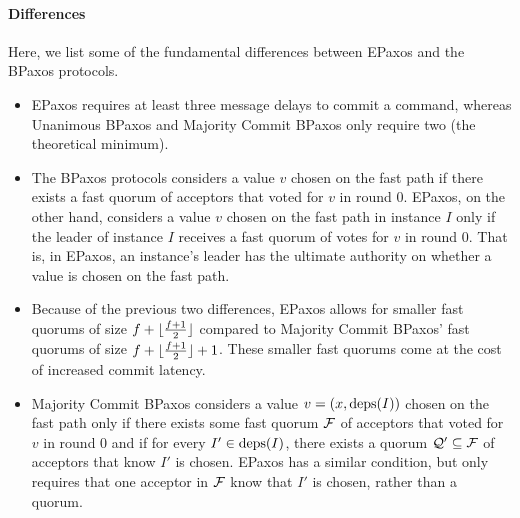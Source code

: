 \paragraph{Differences}
Here, we list some of the fundamental differences between EPaxos and the BPaxos
protocols.
\begin{itemize}
  \item
    EPaxos requires at least three message delays to commit a command, whereas
    Unanimous BPaxos and Majority Commit BPaxos only require two (the
    theoretical minimum).

  \item
    The BPaxos protocols considers a value $v$ chosen on the fast path if there
    exists a fast quorum of acceptors that voted for $v$ in round $0$.  EPaxos,
    on the other hand, considers a value $v$ chosen on the fast path in
    instance $I$ only if the leader of instance $I$ receives a fast quorum of
    votes for $v$ in round $0$.  That is, in EPaxos, an instance's leader has
    the ultimate authority on whether a value is chosen on the fast path.

  \item
    Because of the previous two differences, EPaxos allows for smaller fast
    quorums of size $f + \lfloor\frac{f+1}{2}\rfloor$ compared to Majority Commit
    BPaxos' fast quorums of size $f + \lfloor\frac{f + 1}{2}\rfloor + 1$. These smaller fast quorums
    come at the cost of increased commit latency.

  \item
    Majority Commit BPaxos considers a value $v = (x, \text{deps}(I))$ chosen on the
    fast path only if there exists some fast quorum $\mathcal{F}$ of acceptors
    that voted for $v$ in round $0$ and if for every $I' \in \text{deps}(I)$, there
    exists a quorum $\mathcal{Q}' \subseteq \mathcal{F}$ of acceptors that know
    $I'$ is chosen. EPaxos has a similar condition, but only requires that one
    acceptor in $\mathcal{F}$ know that $I'$ is chosen, rather than a quorum.
\end{itemize}
